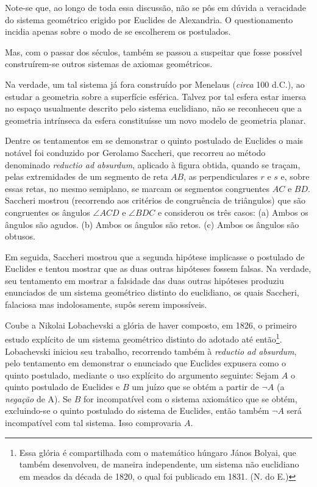 \documentclass{hipatia}
\begin{document}
Note-se que, ao longo de toda essa discussão, não se pôs em dúvida a veracidade do sistema geométrico erigido por Euclides de Alexandria. O questionamento incidia apenas sobre o modo de se escolherem os postulados. 

Mas, com o passar dos séculos, também se passou a suspeitar que fosse possível construírem-se outros sistemas de axiomas geométricos. 

Na verdade, um tal sistema já fora construído por Menelaus (\emph{circa} 100 d.C.), ao estudar a geometria sobre a superfície esférica. Talvez por tal esfera estar imersa no espaço usualmente descrito pelo sistema euclidiano, não se reconheceu que a geometria intrínseca da esfera constituísse um novo modelo de geometria planar.  \cite[p. 57]{struik1987} 

Dentre os tentamentos em se demonstrar o quinto postulado de Euclides o mais notável foi conduzido por Gerolamo Saccheri, que recorreu ao método denominado \emph{reductio ad absurdum}, aplicado à figura obtida, quando se traçam, pelas extremidades de um segmento de reta $AB$, as perpendiculares $r$ e $s$ e, sobre essas retas, no mesmo semiplano, se marcam os segmentos congruentes $AC$ e $BD$. Saccheri mostrou (recorrendo aos critérios de congruência de triângulos) que são congruentes os ângulos $\angle ACD$ e $\angle BDC$ e considerou os três casos: 
(a)  Ambos os ângulos são agudos. 
(b)  Ambos os ângulos são retos. 
(c)  Ambos os ângulos são obtusos.

Em seguida, Saccheri mostrou que a segunda hipótese implicasse o postulado de Euclides e tentou mostrar que as duas outras hipóteses fossem falsas. Na verdade, seu tentamento em mostrar a falsidade das duas outras hipóteses produziu enunciados de um sistema geométrico distinto do euclidiano, os quais Saccheri, falaciosa mas indolosamente, supôs serem impossíveis.  \cite[p. 182]{kneebone1963}

Coube a Nikolai Lobachevski a glória de haver composto, em 1826, o primeiro estudo explícito de um sistema geométrico distinto do adotado até então\footnote{
Essa glória é compartilhada com o matemático húngaro
János Bolyai, que também desenvolveu, de maneira independente, um sistema não euclidiano em meados da década de 1820, o qual foi publicado em 1831.  
(N. do E.)}. Lobachevski iniciou seu trabalho, recorrendo também à \emph{reductio ad absurdum}, pelo tentamento em demonstrar o enunciado que Euclides expusera como o quinto postulado, mediante o uso explícito do argumento seguinte: Sejam $A$ o quinto postulado de Euclides e $B$ um juízo que se obtém a partir de $\neg A$  (a \emph{negação} de A). Se $B$ for incompatível com o sistema axiomático que se obtém, excluindo-se o quinto postulado do sistema de Euclides, então também $\neg A$ será incompatível com tal sistema. Isso comprovaria $A$.   \cite[p. 29]{bachelard1934}\cite[p. 388]{kneale}\cite[p. 13--14]{smogorzhevski1976}      
\end{document}
